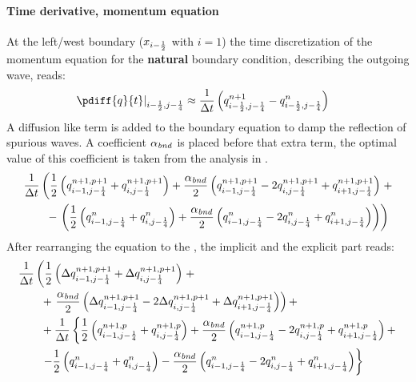 \paragraph*{Time derivative, momentum equation}
At the left/west boundary ($x_{i-\frac{1}{2}}$ with $i=1$) the time discretization of the momentum equation for the \textbf{natural} boundary condition, describing the outgoing wave, reads:
\begin{align}
    \left. \pdiff{q}{t} \right|_{i-\half, j-\quart} & \approx \frac{1}{\Dt} \left(  q^{n+1}_{i-\half, j-\quart} - q^{n}_{i-\half, j-\quart} \right)
\end{align}
A diffusion like term is added to the boundary equation to damp the reflection of spurious waves.
A coefficient $\alpha_{\it bnd}$ is placed before that extra term, the optimal value of this coefficient is taken from the analysis in \citet{transpeq-analysisdiscretizationinsidedomain_boundaries.mw}.
\begin{align}
    & \frac{1}{\Delta t}\left( \frac{1}{2} \left( q^{n+1,p+1}_{i-1, j-\frac{1}{4}} + q^{n+1,p+1}_{i, j-\frac{1}{4}} \right)
    + \frac{\alpha_{\it bnd}}{2} \left( q^{n+1,p+1}_{i-1, j-\frac{1}{4}} - 2 q^{n+1,p+1}_{i, j-\frac{1}{4}} + q^{n+1,p+1}_{i+1, j-\frac{1}{4}}  \right) \right. +
    \nonumber \\*
    & \qquad  - \left. \left(
    \frac{1}{2} \left( q^{n}_{i-1, j-\frac{1}{4}} + q^{n}_{i, j-\frac{1}{4}} \right)
    + \frac{\alpha_{\it bnd}}{2}  \left( q^{n}_{i-1, j-\frac{1}{4}} - 2 q^{n}_{i, j-\frac{1}{4}} + q^{n}_{i+1, j-\frac{1}{4}}  \right) \right)
    \right)
\end{align}
After rearranging the equation to the \deltaformulation, the implicit and the explicit part reads:
\begin{align}
    & \frac{1}{\Delta t}  \left( \frac{1}{2} \left( \Delta q^{n+1, p+1}_{i-1, j-\frac{1}{4}} + \Delta q^{n+1, p+1}_{i, j-\frac{1}{4}} \right) \right. +
    \nonumber \\*
    & \qquad + \left. \frac{\alpha_{\it bnd}}{2}\left( \Delta q^{n+1,p+1}_{i-1, j-\frac{1}{4}} - 2 \Delta q^{n+1,p+1}_{i, j-\frac{1}{4}} + \Delta q^{n+1,p+1}_{i+1, j-\frac{1}{4}} \right) \right) +
    \nonumber \\
    & \qquad +  \frac{1}{\Delta t} \left\{ \frac{1}{2} \left( q^{n+1, p}_{i-1, j-\frac{1}{4}} + q^{n+1, p}_{i, j-\frac{1}{4}} \right) + \frac{\alpha_{\it bnd}}{2}\left( q^{n+1,p}_{i-1, j-\frac{1}{4}} - 2 q^{n+1,p}_{i, j-\frac{1}{4}}  + q^{n+1,p}_{i+1, j-\frac{1}{4}} \right) + \right.
    \nonumber \\*
    & \qquad
    \left.  - \frac{1}{2} \left( q^{n}_{i-1, j-\frac{1}{4}} + q^{n}_{i, j-\frac{1}{4}} \right) - \frac{\alpha_{\it bnd}}{2} \left( q^{n}_{i-1, j-\frac{1}{4}} - 2 q^{n}_{i, j-\frac{1}{4}} + q^{n}_{i+1, j-\frac{1}{4}}  \right) \right\}
\end{align}
